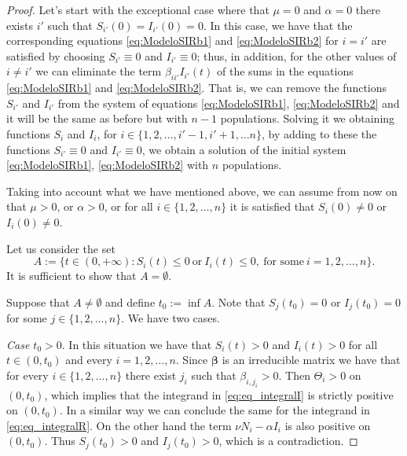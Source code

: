 \documentclass[a4paper,10pt]{article}
\theoremstyle{remark}
\begin{document}
\begin{proof} 



Let's start with the exceptional case where that $\mu=0$ and $\alpha=0$ there exists $i'$ such that $S_{i'}(0)=I_{i'}(0)=0$. In this case, we have that the corresponding equations \eqref{eq:ModeloSIRb1} and \eqref{eq:ModeloSIRb2} for $i=i'$ are satisfied by choosing $S_{i'}\equiv 0$ and $I_{i'}\equiv 0$;  thus, in addition, for the other values of $i\neq i'$ we can eliminate the term $\beta_{ii'}I_{i'}(t)$ of the sums in the equations \eqref{eq:ModeloSIRb1} and \eqref{eq:ModeloSIRb2}. That is, we can remove the functions $S_{i'}$ and $I_{i'}$ from the system of equations \eqref{eq:ModeloSIRb1}, \eqref{eq:ModeloSIRb2} and it will be the same as before but with $n-1$ populations. Solving it we obtaining functions $S_{i}$ and $I_i$, for $i\in\{1,2,\ldots,i'-1,i'+1,\ldots n\}$, by adding to these the functions $S_{i'}\equiv 0$ and $I_{i'}\equiv 0$, we obtain a solution of the initial system \eqref{eq:ModeloSIRb1}, \eqref{eq:ModeloSIRb2} with $n$ populations.

Taking into account what we have mentioned above, we can assume from now on that $\mu>0$, or $\alpha>0$, or for all $i\in\{1,2,\ldots,n\}$ it is satisfied that $S_i(0)\neq 0$ or $I_i(0)\neq 0$.


Let us consider the set
$$A:=\{t\in (0,+\infty): S_i(t)\leq 0\ \text{or}\ I_i(t)\leq 0,\ \text{for some}\ i=1,2,\ldots,n\}.$$
It is sufficient to show that $A=\emptyset$. 

Suppose that $A\neq \emptyset$ and define $t_0:=\inf A$.
Note that  $S_j(t_0)=0$ or $I_j(t_0)=0$ for some 
$j\in\{1,2,\ldots,n\}$.  We have two cases. 

\emph{Case $t_0>0.$} In this situation we have that $S_i(t)>0$ and $I_i(t)>0$ for all $t\in (0,t_0)$ and every $i=1,2,\ldots,n$. Since $\boldsymbol{\beta}$ is an irreducible matrix we have that for every $i\in\{1,2,\ldots,n\}$ there exist $j_i$ such that $\beta_{i,j_i}>0$. Then $\Theta_i>0$ on $(0,t_0)$, which implies that the integrand in \eqref{eq:eq_integralI} is strictly positive on $(0,t_0)$. In a similar way we can conclude the same for the integrand in \eqref{eq:eq_integralR}. On the other hand the term $\nu N_i-\alpha I_i$ is also positive on $(0,t_0)$. Thus $S_j(t_0)>0$ and $I_j(t_0)>0$, which is a contradiction.




\end{proof}
\end{document}
